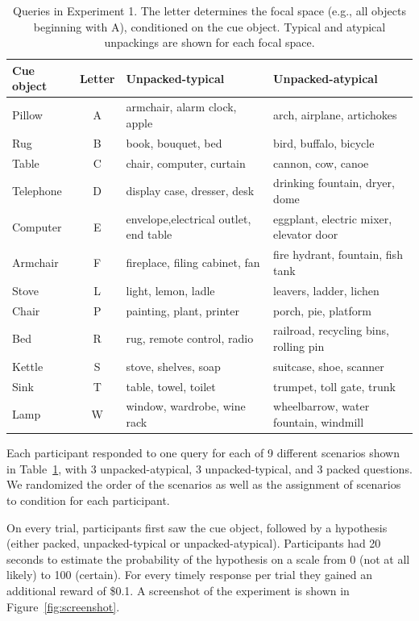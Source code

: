 \begin{table}[htbp]
\caption{Queries in Experiment 1. The letter determines the focal space (e.g., all objects beginning with A), conditioned on the cue object. Typical and atypical unpackings are shown for each focal space.}
\label{tab:scenarios}
\centering
\begin{tabular}{l|c|l|l}
\bf{Cue object} & \bf{Letter} & \bf{Unpacked-typical} & \bf{Unpacked-atypical}\\\hline
Pillow & A & armchair, alarm clock, apple & arch, airplane, artichokes\\
Rug & B & book, bouquet, bed & bird, buffalo, bicycle\\
Table & C & chair, computer, curtain & cannon, cow, canoe\\
Telephone & D & display case, dresser, desk & drinking fountain, dryer, dome\\
Computer & E & envelope,electrical outlet, end table & eggplant, electric mixer, elevator door\\
Armchair & F & fireplace, filing cabinet, fan& fire hydrant, fountain, fish tank\\
Stove & L & light, lemon, ladle& leavers, ladder, lichen\\
Chair & P & painting, plant, printer& porch, pie, platform\\
Bed & R & rug, remote control, radio & railroad, recycling bins, rolling pin\\
Kettle & S & stove, shelves, soap& suitcase, shoe, scanner\\
Sink & T & table, towel, toilet & trumpet, toll gate, trunk\\
Lamp & W & window, wardrobe, wine rack & wheelbarrow, water fountain, windmill\\
\end{tabular}
\end{table}

Each participant responded to one query for each of 9 different scenarios shown in Table~\ref{tab:scenarios}, with 3 unpacked-atypical, 3 unpacked-typical, and 3 packed questions. We randomized the order of the scenarios as well as the assignment of scenarios to condition for each participant.

On every trial, participants first saw the cue object, followed by a hypothesis (either packed, unpacked-typical or unpacked-atypical). Participants had 20 seconds to estimate the probability of the hypothesis on a scale from 0 (not at all likely) to 100 (certain). For every timely response per trial they gained an additional reward of \$0.1. A screenshot of the experiment is shown in Figure~\ref{fig:screenshot}.

